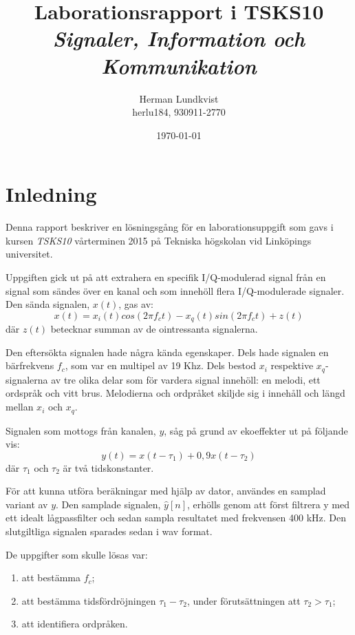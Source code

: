 \documentclass[10pt,twocolumn]{article}
\title{Laborationsrapport i TSKS10 \emph{Signaler, Information och Kommunikation}}
\author{Herman Lundkvist \\ herlu184, 930911-2770 }
\date{\today}
\begin{document}
\maketitle

\section{Inledning}

Denna rapport beskriver en lösningsgång för en laborationsuppgift som gavs i
kursen \emph{TSKS10} vårterminen 2015 på Tekniska högskolan vid Linköpings
universitet.

Uppgiften gick ut på att extrahera en specifik I/Q-modulerad signal från en signal som sändes
över en kanal och som innehöll flera I/Q-modulerade signaler. Den sända signalen, $x(t)$, gas av:
\begin{equation}
x(t) = x_i(t) cos(2 \pi f_ct) - x_q(t) sin(2 \pi f_c t) + z(t)
\label{e1}
\end{equation}
där $z(t)$ betecknar summan av de ointressanta signalerna.

Den eftersökta signalen hade några kända egenskaper. Dels hade signalen en
bärfrekvens $f_c$, som var en multipel av 19 Khz. Dels bestod $x_i$ respektive
$x_q$-signalerna av tre olika delar som för vardera signal innehöll: en melodi, ett ordspråk
och vitt brus. Melodierna och ordpråket skiljde sig i
innehåll och längd mellan $x_i$ och $x_q$.

Signalen som mottogs från kanalen, $y$, såg på grund av ekoeffekter ut på
följande vis:
\begin{equation}
    y(t)=x(t - \tau_1) + 0,9 x(t - \tau_2)
\end{equation}
där $\tau_1$ och $\tau_2$ är två tidskonstanter.

För att kunna utföra beräkningar med hjälp av dator, användes en samplad
variant av $y$. Den samplade signalen, $\hat{y}[n]$, erhölls genom att först
filtrera y med ett idealt lågpassfilter och sedan sampla resultatet med
frekvensen 400 kHz. Den slutgiltliga signalen sparades sedan i wav format.

De uppgifter som skulle lösas var:
\begin{enumerate}
\item att bestämma $f_c$;
\item att bestämma tidsfördröjningen $\tau_1-\tau_2$, under förutsättningen att
$\tau_2 > \tau_1$;
\item att identifiera ordpråken.
\end{enumerate}
\end{document}

